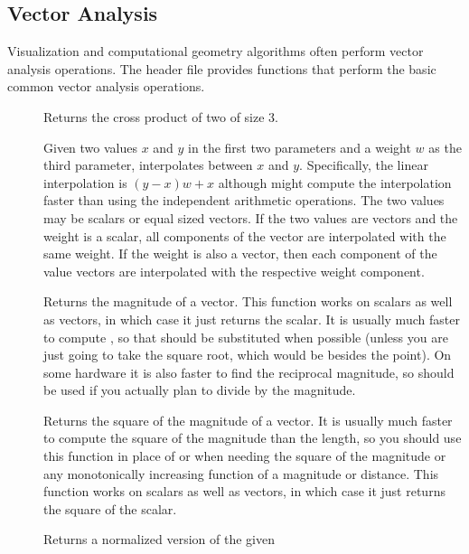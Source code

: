 \subsection{Vector Analysis}


Visualization and computational geometry algorithms often perform vector
analysis operations. The  header file
provides functions that perform the basic common vector analysis
operations.

\begin{description}
\item[]  Returns the cross product of
  two  of size 3.
\item[]  Given two values $x$ and
  $y$ in the first two parameters and a weight $w$ as the third parameter,
  interpolates between $x$ and $y$. Specifically, the linear interpolation
  is $(y-x)w + x$ although  might compute the
  interpolation faster than using the independent arithmetic operations.
  The two values may be scalars or equal sized vectors. If the two values
  are vectors and the weight is a scalar, all components of the vector are
  interpolated with the same weight. If the weight is also a vector, then
  each component of the value vectors are interpolated with the respective
  weight component.
\item[] Returns the magnitude of a vector. This function
  works on scalars as well as vectors, in which case it just returns the
  scalar. It is usually much faster to compute
  , so that should be substituted when
  possible (unless you are just going to take the square root, which would
  be besides the point). On some hardware it is also faster to find the
  reciprocal magnitude, so  should be used if
  you actually plan to divide by the magnitude.
\item[] Returns the square of the magnitude of a
  vector. It is usually much faster to compute the square of the magnitude
  than the length, so you should use this function in place of
   or  when needing
  the square of the magnitude or any monotonically increasing function of a
  magnitude or distance. This function works on scalars as well as vectors,
  in which case it just returns the square of the scalar.
\item[] Returns a normalized version of the given

\end{description}
